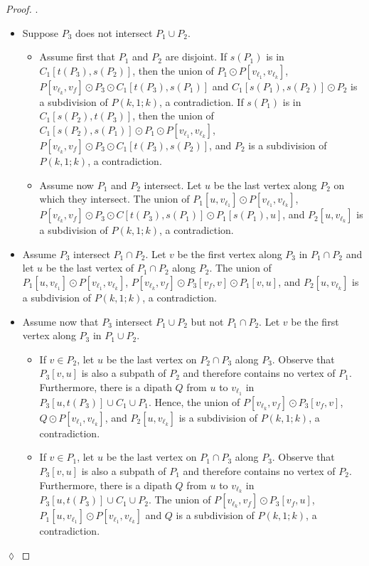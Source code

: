 \documentclass[utf8,10pt]{article}
\theoremstyle{plain}
\theoremstyle{definition}
\theoremstyle{remark}
\newenvironment{subproof}{\par\noindent {\it Subproof}.\ }{\hfill$\lozenge$\par\vspace{11pt}}
\begin{document}
\begin{proof}
\begin{subproof}
\begin{itemize}
	\item Suppose $P_3$ does not intersect $P_1 \cup P_2$.
	\begin{itemize}
		\item Assume first that $P_1$ and $P_2$ are disjoint. If $s(P_1)$ is in $C_1[t(P_3), s(P_2)]$, then the union of  $P_1 \odot P[v_{\ell_1}, v_{\ell_k}]$, $P[v_{\ell_k}, v_f] \odot P_3\odot C_1[t(P_3), s(P_1)]$ and $C_1[s(P_1), s(P_2)]\odot P_2$ is a subdivision of $P(k,1;k)$, a contradiction.
		 If $s(P_1)$ is in $C_1[ s(P_2), t(P_3)]$, then the union of  $C_1[s(P_2), s(P_1)]\odot P_1\odot P[v_{\ell_1}, v_{\ell_k}]$, $P[v_{\ell_k}, v_f]\odot  P_3\odot C_1[t(P_3), s(P_2)]$, and  $P_2$ is a subdivision of $P(k,1;k)$, a contradiction.
	
		\item Assume now $P_1$ and $P_2$ intersect. Let $u$ be the last vertex along $P_2$ on which they intersect. The union of $P_1[u,v_{\ell_1}]\odot P[v_{\ell_1}, v_{\ell_k}]$, $P[v_{\ell_k}, v_f]\odot P_3\odot C[t(P_3), s(P_1)]\odot P_1[s(P_1), u]$, and $P_2[u, v_{\ell_k}]$ is a subdivision of $P(k,1;k)$, a contradiction.
	\end{itemize}

	\item Assume $P_3$ intersect $P_1\cap P_2$. Let $v$ be the first vertex along $P_3$ in $P_1\cap P_2$ and let $u$ be the last vertex of $P_1\cap P_2$ along $P_2$. The union of $P_1[u,v_{\ell_1}]\odot P[v_{\ell_1}, v_{\ell_k}]$, $P[v_{\ell_k}, v_f]\odot P_3[v_f,v]\odot P_1[v, u]$, and $P_2[u, v_{\ell_k}]$ is a subdivision of $P(k,1;k)$, a contradiction.

	\item Assume now that $P_3$ intersect $P_1\cup P_2$ but not $P_1\cap P_2$. Let $v$ be the first vertex along $P_3$ in $P_1\cup P_2$.
	\begin{itemize}
	\item If $v \in P_2$, let $u$ be the last vertex on $P_2\cap P_3$ along $P_3$. Observe that $P_3[v,u]$ is also a subpath of $P_2$ and therefore contains no vertex of $P_1$. Furthermore, there is a dipath $Q$ from $u$ to $v_{\ell_1}$ in $P_3[u, t(P_3)]\cup C_1\cup  P_1$. Hence, the union of $P[v_{\ell_k}, v_f] \odot P_3[v_f,v]$, $Q\odot P[v_{\ell_1},v_{\ell_k}]$, and $P_2[u,v_{\ell_k}]$ is a subdivision of $P(k,1;k)$, a contradiction.
	
	\item If $v\in P_1$, let $u$ be the last vertex on $P_1\cap P_3$ along $P_3$.  Observe that $P_3[v,u]$ is also a subpath of $P_1$ and therefore contains no vertex of $P_2$. Furthermore, there is a dipath $Q$ from $u$ to $v_{\ell_k}$ in $P_3[u, t(P_3)]\cup C_1\cup  P_2$.
	The union of $P[v_{\ell_k}, v_f] \odot P_3[v_f,u]$, $P_1[u, v_{\ell_1}]\odot P[v_{\ell_1}, v_{\ell_k}]$ and $Q$ is a subdivision of $P(k,1;k)$, a contradiction.


\end{itemize}
\end{itemize}
\end{subproof}
\end{proof}
\end{document}
